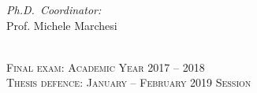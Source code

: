\begin{titlepage}
\begin{center}
\begin{minipage}{0.45\textwidth}
\begin{flushright}
\emph{Ph.D.\ Coordinator:} \\
Prof. Michele Marchesi\\
\end{flushright}
\end{minipage}\\[3.2\baselineskip]

\textsc{Final exam: Academic Year 2017 -- 2018}\\
\textsc{Thesis defence: January -- February 2019 Session}

\vfill

\end{center}
\end{titlepage}
